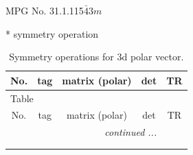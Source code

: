 \documentclass[fleqn,8pt]{jsarticle}
\begin{document}
\setcounter{MaxMatrixCols}{32}

\renewcommand{\tablename}{Table~}
\renewcommand{\figurename}{Figure~}
\begin{center}
\LARGE
MPG No. 31.1.115\quad$\bar{4}3m$
\end{center}
* symmetry operation
\renewcommand{\arraystretch}{1.3}
\begin{longtable}{ccccc}
\caption{Symmetry operations for 3d polar vector.}
 \\
 \hline \hline
No. & tag & matrix (polar) & det & TR \\ \hline \endfirsthead

\multicolumn{4}{l}{\tablename\ \thetable{}} \\
 \hline \hline
No. & tag & matrix (polar) & det & TR \\ \hline \endhead

 \hline \hline
\multicolumn{4}{r}{\footnotesize\it continued ...} \\ \endfoot

 \hline \hline
\multicolumn{4}{r}{} \\ \endlastfoot


\end{longtable}
\end{document}
